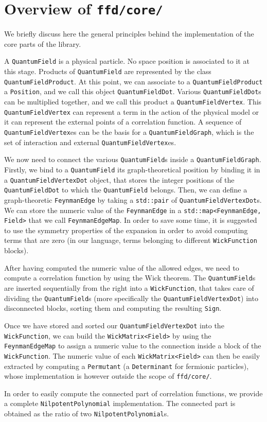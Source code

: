\chapter{Overview of \texttt{ffd/core/}}
We briefly discuss here the general principles behind the implementation of the core parts of the library.

A \texttt{QuantumField} is a physical particle. No space position is associated to it at this stage. Products of \texttt{QuantumField} are represented by the class \texttt{QuantumFieldProduct}. At this point, we can associate to a \texttt{QuantumFieldProduct} a \texttt{Position}, and we call this object \texttt{QuantumFieldDot}. Various \texttt{QuantumFieldDot}s can be multiplied together, and we call this product a \texttt{QuantumFieldVertex}. This \texttt{QuantumFieldVertex} can represent a term in the action of the physical model or it can represent the external points of a correlation function. A sequence of \texttt{QuantumFieldVertex}es can be the basis for a \texttt{QuantumFieldGraph}, which is the set of interaction and external \texttt{QuantumFieldVertex}es.

We now need to connect the various \texttt{QuantumField}s inside a \texttt{QuantumFieldGraph}. Firstly, we bind to a \texttt{QuantumField} its graph-theoretical position by binding it in a \texttt{QuantumFieldVertexDot} object, that stores the integer positions of the \texttt{QuantumFieldDot} to which the \texttt{QuantumField} belongs. Then, we can define a graph-theoretic \texttt{FeynmanEdge} by taking a \texttt{std::pair} of \texttt{QuantumFieldVertexDot}s. We can store the numeric value of the \texttt{FeynmanEdge} in a \texttt{std::map<FeynmanEdge, Field>} that we call \texttt{FeynmanEdgeMap}. In order to save some time, it is suggested to use the symmetry properties of the expansion in order to avoid computing terms that are zero (in our language, terms belonging to different \texttt{WickFunction} blocks).

After having computed the numeric value of the allowed edges, we need to compute a correlation function by using the Wick theorem. The \texttt{QuantumField}s are inserted sequentially from the right into a \texttt{WickFunction}, that takes care of dividing the \texttt{QuantumField}s (more specifically the \texttt{QuantumFieldVertexDot}) into disconnected blocks, sorting them and computing the resulting \texttt{Sign}.

Once we have stored and sorted our \texttt{QuantumFieldVertexDot} into the \texttt{WickFunction}, we can build the \texttt{WickMatrix<Field>} by using the \texttt{FeynmanEdgeMap} to assign a numeric value to the connection inside a block of the \texttt{WickFunction}. The numeric value of each \texttt{WickMatrix<Field>} can then be easily extracted by computing a \texttt{Permutant} (a \texttt{Determinant} for fermionic particles), whose implementation is however outside the scope of \texttt{ffd/core/}.

In order to easily compute the connected part of correlation functions, we provide a complete \texttt{NilpotentPolynomial} implementation. The connected part is obtained as the ratio of two \texttt{NilpotentPolynomial}s.

